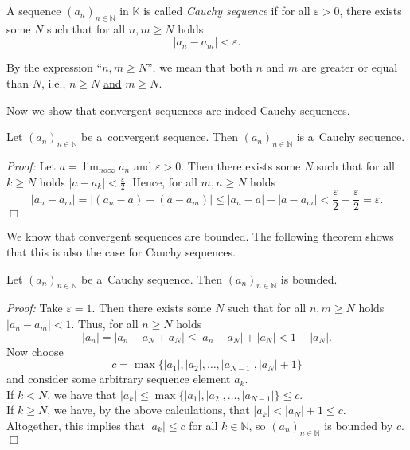 

\begin{Definition}
A sequence $(a_n)_{n\in\mathbb{N}}$ in $\mathbb{K}$ is called \textit{Cauchy sequence} if for all $\varepsilon>0$, there exists some $N$ such that for all $n,m\geq N$ holds
\[|a_n-a_m|<\varepsilon.\]
\end{Definition}
\begin{Remark}{}
By the expression ``$n,m\geq N$'', we mean that both $n$ and $m$ are greater or equal than $N$, i.e., $n\geq N$ \underline{and} $m\geq N$.
\end{Remark}

Now we show that convergent sequences are indeed Cauchy sequences.
\begin{Theorem}{}\label{thm:convcauch}
    Let $(a_n)_{n\in\mathbb{N}}$ be a~convergent sequence. Then $(a_n)_{n\in\mathbb{N}}$ is a~Cauchy sequence.
\end{Theorem}
{\em Proof:}
Let $a=\lim_{n	o\infty}a_{n}$ and $\varepsilon>0$. Then there exists some $N$ such that for all $k\geq N$ holds $|a-a_k|<\frac{\varepsilon}2$. Hence, for all $m,n\geq N$ holds
\[|a_n-a_m|=|(a_n-a)+(a-a_m)|\leq|a_n-a|+|a-a_m|< \frac{\varepsilon}2+\frac{\varepsilon}2=\varepsilon.\]
$\Box$

We know that convergent sequences are bounded.
The following theorem shows that this is also the case for Cauchy sequences. 
\begin{Theorem}\label{thm:cauchseqbnd}
    Let $(a_n)_{n\in\mathbb{N}}$ be a~Cauchy sequence. Then $(a_n)_{n\in\mathbb{N}}$ is bounded.
\end{Theorem}
{\em Proof:} Take $\varepsilon=1$. Then there exists some $N$ such that for all $n,m\geq N$ holds $|a_n-a_m|<1$. Thus, for all $n\geq N$ holds
\[|a_n|=|a_n-a_N+a_N|\leq |a_n-a_N|+|a_N|<1+|a_N|.\]
Now choose
\[c=\max\{|a_1|,|a_2|,\ldots,|a_{N-1}|,|a_N|+1\}\]
and consider some arbitrary sequence element $a_k$.\\
If $k<N$, we have that $|a_k|\leq \max\{|a_1|,|a_2|,\ldots,|a_{N-1}|\}\leq c$.\\
If $k\geq N$, we have, by the above calculations, that $|a_k|<|a_N|+1\leq c$.\\
Altogether, this implies that $|a_k|\leq c$ for all $k\in\mathbb{N}$, so $(a_n)_{n\in\mathbb{N}}$ is bounded by $c$.\hfill$\Box$

